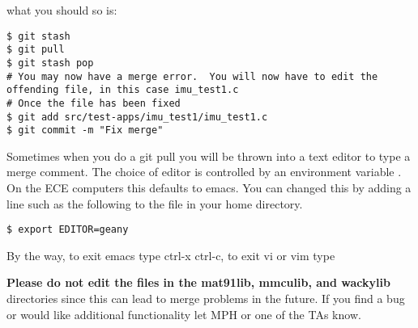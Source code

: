 what you should so is:

\begin{verbatim}
$ git stash
$ git pull
$ git stash pop
# You may now have a merge error.  You will now have to edit the offending file, in this case imu_test1.c
# Once the file has been fixed
$ git add src/test-apps/imu_test1/imu_test1.c
$ git commit -m "Fix merge"
\end{verbatim}

Sometimes when you do a git pull you will be thrown into a text editor
to type a merge comment. The choice of editor is controlled by an
environment variable . On the ECE computers this defaults
to emacs. You can changed this by adding a line such as the following to
the  file in your home directory.

\begin{verbatim}
$ export EDITOR=geany
\end{verbatim}

By the way, to exit emacs type ctrl-x ctrl-c, to exit vi or vim type 

\textbf{Please do not edit the files in the mat91lib, mmculib, and
wackylib} directories since this can lead to merge problems in the
future. If you find a bug or would like additional functionality let MPH
or one of the TAs know.
